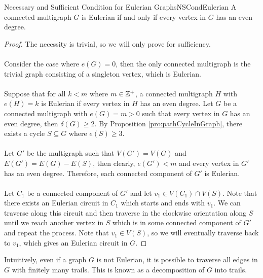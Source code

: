 \documentclass[math, code]{amznotes}
\theoremstyle{remark}
\begin{document}
\begin{thmbox}{Necessary and Sufficient Condition for Eulerian Graphs}{NSCondEulerian}
    A connected multigraph $G$ is Eulerian if and only if every vertex in $G$ has an even degree.
    \tcblower
    \begin{proof}
        The necessity is trivial, so we will only prove for sufficiency.
        \\\\
        Consider the case where $e(G) = 0$, then the only connected multigraph is the trivial graph consisting of a singleton vertex, which is Eulerian. 
        \\\\
        Suppose that for all $k < m$ where $m \in \mathbb{Z}^+$, a connected multigraph $H$ with $e(H) = k$ is Eulerian if every vertex in $H$ has an even degree. Let $G$ be a connected multigraph with $e(G) = m > 0$ such that every vertex in $G$ has an even degree, then $\delta(G) \geq 2$. By Proposition \ref{pro:pathCycleInGraph}, there exists a cycle $S \subseteq G$ where $e(S) \geq 3$.
        \\\\
        Let $G'$ be the multigraph such that $V(G') = V(G)$ and $E(G') = E(G) - E(S)$, then clearly, $e(G') < m$ and every vertex in $G'$ has an even degree. Therefore, each connected component of $G'$ is Eulerian.
        \\\\
        Let $C_1$ be a connected component of $G'$ and let $v_1 \in V(C_1) \cap V(S)$. Note that there exists an Eulerian circuit in $C_1$ which starts and ends with $v_1$. We can traverse along this circuit and then traverse in the clockwise orientation along $S$ until we reach another vertex in $S$ which is in some connected component of $G'$ and repeat the process. Note that $v_1 \in V(S)$, so we will eventually traverse back to $v_1$, which gives an Eulerian circuit in $G$.
    \end{proof}
\end{thmbox}
Intuitively, even if a graph $G$ is not Eulerian, it is possible to traverse all edges in $G$ with finitely many trails. This is known as a decomposition of $G$ into trails.
\end{document}

